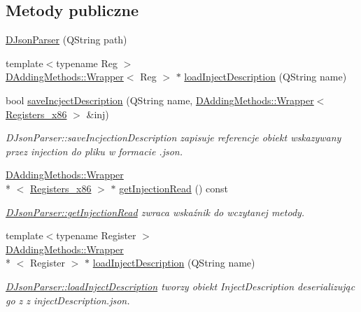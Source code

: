\subsection*{Metody publiczne}
\begin{DoxyCompactItemize}
\item 
\hyperlink{class_d_json_parser_ab1d4f6d9c863888595a4d4568114b7b4}{D\-Json\-Parser} (Q\-String path)
\item 
{\footnotesize template$<$typename Reg $>$ }\\\hyperlink{class_d_adding_methods_1_1_wrapper}{D\-Adding\-Methods\-::\-Wrapper}$<$ Reg $>$ $\ast$ \hyperlink{class_d_json_parser_a14c19cd1d981e908ef8dfbc4218b359f}{load\-Inject\-Description} (Q\-String name)
\item 
bool \hyperlink{class_d_json_parser_a6d680ce58c2e6b638223071d996a2c0f}{save\-Incject\-Description} (Q\-String name, \hyperlink{class_d_adding_methods_1_1_wrapper}{D\-Adding\-Methods\-::\-Wrapper}$<$ \hyperlink{codedefines_8h_a0f84efe4ca4d99203713a78bd6e8c82e}{Registers\-\_\-x86} $>$ \&inj)
\begin{DoxyCompactList}\small\item\em D\-Json\-Parser\-::save\-Incjection\-Description zapisuje referencje obiekt wskazywany przez injection do pliku w formacie .json. \end{DoxyCompactList}\item 
\hyperlink{class_d_adding_methods_1_1_wrapper}{D\-Adding\-Methods\-::\-Wrapper}\\*
$<$ \hyperlink{codedefines_8h_a0f84efe4ca4d99203713a78bd6e8c82e}{Registers\-\_\-x86} $>$ $\ast$ \hyperlink{class_d_json_parser_a0603bac0338a1ae401b3f58cfc1d67c9}{get\-Injection\-Read} () const 
\begin{DoxyCompactList}\small\item\em \hyperlink{class_d_json_parser_a0603bac0338a1ae401b3f58cfc1d67c9}{D\-Json\-Parser\-::get\-Injection\-Read} zwraca wskaźnik do wczytanej metody. \end{DoxyCompactList}\item 
{\footnotesize template$<$typename Register $>$ }\\\hyperlink{class_d_adding_methods_1_1_wrapper}{D\-Adding\-Methods\-::\-Wrapper}\\*
$<$ Register $>$ $\ast$ \hyperlink{class_d_json_parser_a3baa4948e78cb386c8eb7e6634ab4d03}{load\-Inject\-Description} (Q\-String name)
\begin{DoxyCompactList}\small\item\em \hyperlink{class_d_json_parser_a14c19cd1d981e908ef8dfbc4218b359f}{D\-Json\-Parser\-::load\-Inject\-Description} tworzy obiekt Inject\-Description deserializując go z z inject\-Description.\-json. \end{DoxyCompactList}\end{DoxyCompactItemize}
